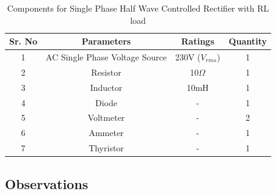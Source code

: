 \begin{table}[h]
    \renewcommand{\arraystretch}{1.3}
    \label{table_components_required_single-phase-half-wave-controlled-rectifier-with-RL-load}
    \centering
    \begin{tabular}{|c|c|c|c|}
        \hline
        Sr. No & Parameters                     & Ratings            & Quantity \\
        \hline
        \hline
        1      & AC Single Phase Voltage Source & 230V ($ V_{rms} $) & 1        \\
        \hline
        2      & Resistor                       & 10$ \Omega $       & 1        \\
        \hline
        3      & Inductor                       & 10mH               & 1        \\
        \hline
        4      & Diode                          & -                  & 1        \\
        \hline
        5      & Voltmeter                      & -                  & 2        \\
        \hline
        6      & Ammeter                        & -                  & 1        \\
        \hline
        7      & Thyristor                      & -                  & 1        \\
        \hline
    \end{tabular}
    \caption{Components for Single Phase Half Wave Controlled Rectifier with RL load}

\end{table}




\subsection{Observations}

